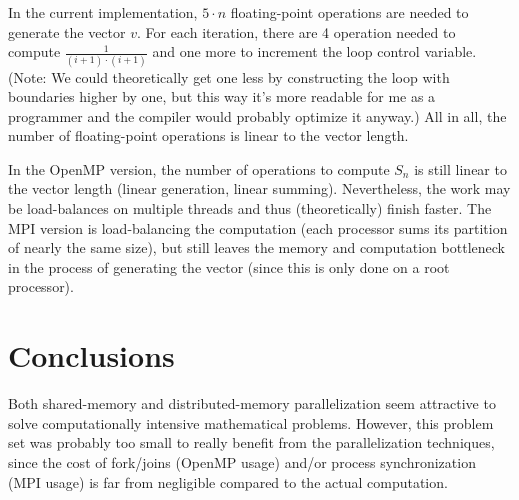 \documentclass[12pt]{simple-assignment} %
\begin{document}
In the current implementation, $5 \cdot n$ floating-point operations are needed to generate the vector $v$. For each iteration, there are 4 operation needed to compute $\frac{1}{(i+1) \cdot (i+1)}$ and one more to increment the loop control variable. (Note: We could theoretically get one less by constructing the loop with boundaries higher by one, but this way it's more readable for me as a programmer and the compiler would probably optimize it anyway.) All in all, the number of floating-point operations is linear to the vector length.

In the OpenMP version, the number of operations to compute $S_n$ is still linear to the vector length (linear generation, linear summing). Nevertheless, the work may be load-balances on multiple threads and thus (theoretically) finish faster. The MPI version is load-balancing the computation (each processor sums its partition of nearly the same size), but still leaves the memory and computation bottleneck in the process of generating the vector (since this is only done on a root processor).

\section{Conclusions}
Both shared-memory and distributed-memory parallelization seem attractive to solve computationally intensive mathematical problems. However, this problem set was probably too small to really benefit from the parallelization techniques, since the cost of fork/joins (OpenMP usage) and/or process synchronization (MPI usage) is far from negligible compared to the actual computation.
\end{document}
